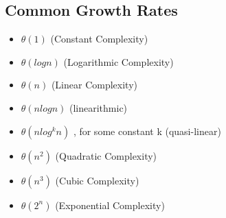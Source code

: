 \documentclass{article}
\begin{document}
\subsection{Common Growth Rates}
\begin{itemize}
\item \(\theta(1)\) (Constant Complexity)
\item \(\theta(log n)\) (Logarithmic Complexity)
\item \(\theta(n)\) (Linear Complexity)
\item \(\theta(n log n)\) (linearithmic)
\item \(\theta(n log^k n)\) , for some constant k (quasi-linear) 
\item \(\theta(n^2)\) (Quadratic Complexity)
\item \(\theta(n^3)\) (Cubic Complexity) 
\item \(\theta(2^n)\) (Exponential Complexity)
\end{itemize}
\end{document}
